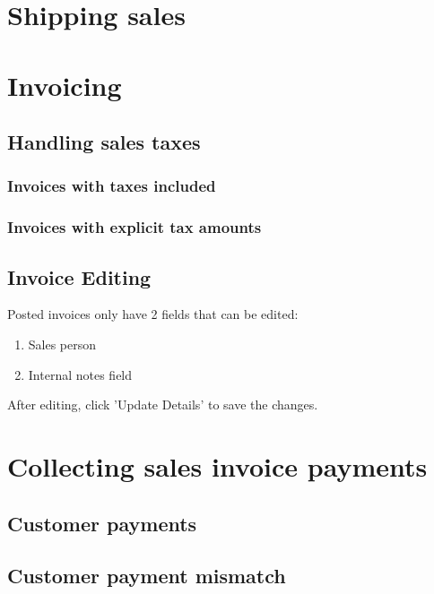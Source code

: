 \chapter{Shipping sales}
\label{cha-shipping-sales}



\chapter{Invoicing}
\label{cha-starting-invoicing}

\section{Handling sales taxes}
\label{sec-invoicing-sales-tax}

\subsection{Invoices with taxes included}
\label{subsec-sales-tax-included}

\subsection{Invoices with explicit tax amounts}
\label{subsec-sales-tax-explicit-amount}

\section{Invoice Editing}
\label{sec-invoicing-editing}

Posted invoices only have 2 fields that can be edited:
\begin{enumerate}
\item Sales person
\item Internal notes field 
\end{enumerate}
After editing, click 'Update Details' to save the changes.

\chapter{Collecting sales invoice payments}
\label{cha-starting-sales-customer-payments}

\section{Customer payments}
\label{sec-starting-sales-customer-payments}

\section{Customer payment mismatch}
\label{sec-starting-sales-payment-mismatch}


